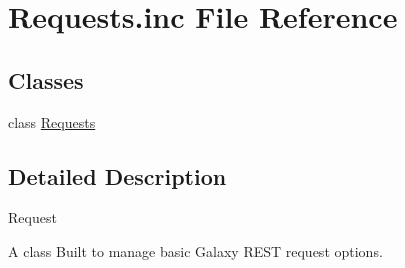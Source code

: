 \hypertarget{Requests_8inc}{}\section{Requests.\+inc File Reference}
\label{Requests_8inc}
\subsection*{Classes}
\begin{DoxyCompactItemize}
\item 
class \hyperlink{classRequests}{Requests}
\end{DoxyCompactItemize}


\subsection{Detailed Description}
Request

A class Built to manage basic Galaxy R\+E\+ST request options. 